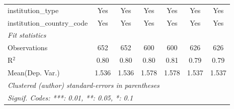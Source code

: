 \begin{tabular}{lcccccc}
   institution\_type                  & Yes     & Yes     & Yes     & Yes          & Yes         & Yes\\  
   institution\_country\_code         & Yes     & Yes     & Yes     & Yes          & Yes         & Yes\\  
   \midrule
   \emph{Fit statistics}\\
   Observations                       & 652     & 652     & 600     & 600          & 626         & 626\\  
   R$^2$                              & 0.80    & 0.80    & 0.80    & 0.81         & 0.79        & 0.79\\  
Mean(Dep. Var.) & 1.536 & 1.536 & 1.578 & 1.578 & 1.537 & 1.537 \\
   \midrule \midrule
   \multicolumn{7}{l}{\emph{Clustered (author) standard-errors in parentheses}}\\
   \multicolumn{7}{l}{\emph{Signif. Codes: ***: 0.01, **: 0.05, *: 0.1}}\\
\end{tabular}
\par\endgroup
